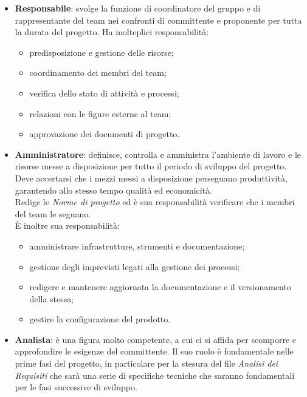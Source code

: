         \begin{itemize}
            \item \textbf{Responsabile}: svolge la funzione di coordinatore del gruppo e di rappresentante del team nei confronti di committente e proponente per tutta la durata del progetto. Ha molteplici responsabilità:
            \begin{itemize}
                \item predisposizione e gestione delle risorse;
                \item coordinamento dei membri del team;
                \item verifica dello stato di attività e processi;
                \item relazioni con le figure esterne al team;
                \item approvazione dei documenti di progetto.
            \end{itemize}
            \item \textbf{Amministratore}: definisce, controlla e amministra l'ambiente di lavoro e le risorse messe a disposizione per tutto il periodo di sviluppo del progetto.
            Deve accertarsi che i mezzi messi a disposizione perseguano produttività, garantendo allo stesso tempo qualità ed economicità. \\
            Redige le \emph{Norme di progetto} ed è sua responsabilità verificare che i membri del team le seguano. \\
            \`E inoltre sua responsabilità:
            \begin{itemize}
                \item amministrare infrastrutture, strumenti e documentazione;
                \item gestione degli imprevisti legati alla gestione dei processi;
                \item redigere e mantenere aggiornata la documentazione e il versionamento della stessa;
                \item gestire la configurazione del prodotto.
            \end{itemize}
            \item \textbf{Analista}: \`e una figura molto competente, a cui ci si affida per scomporre e approfondire le esigenze del committente. Il suo ruolo è fondamentale nelle prime fasi del progetto, in particolare per la stesura del file \emph{Analisi dei Requisiti} che sarà una serie di specifiche tecniche che saranno fondamentali per le fasi successive di sviluppo. \\

\end{itemize}
